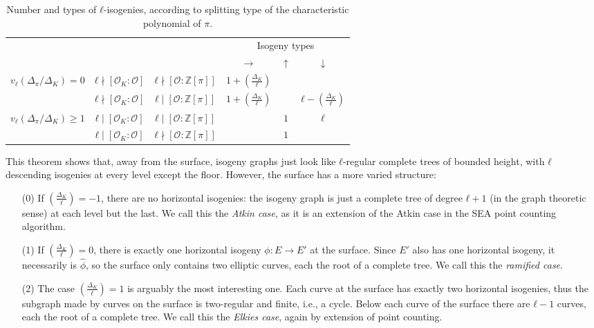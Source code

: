 \documentclass[10pt]{article}
\theoremstyle{plain}
\theoremstyle{definition}
\def\O{\ensuremath{\mathcal{O}}}
\newcommand{\leg}[2]{\left(\frac{#1}{#2}\right)}
\begin{document}
\begin{prposition}
\begin{table}
  \centering
  \def\arraystretch{1.3}
  \begin{tabular}{c | c | c | c c c}
    \multicolumn{3}{c|}{} & \multicolumn{3}{c}{Isogeny types}\\
    \multicolumn{3}{c|}{} & $→$ & $↑$ & $↓$\\
    \hline
    $v_ℓ(Δ_π/Δ_K)=0$ & $ℓ\nmid[\O_K:\O]$ & $ℓ\nmid[\O:ℤ[π]]$ & $1+\leg{Δ_K}{ℓ}$& &\\
    \hline
    & $ℓ\nmid[\O_K:\O]$ & $ℓ\mid[\O:ℤ[π]]$ &$1+\leg{Δ_K}{ℓ}$& &$ℓ-\leg{Δ_K}{ℓ}$\\
    $v_ℓ(Δ_π/Δ_K)≥1$ & $ℓ\mid[\O_K:\O]$ & $ℓ\mid[\O:ℤ[π]]$ &  &$1$&$ℓ$\\
    & $ℓ\mid[\O_K:\O]$ & $ℓ\nmid[\O:ℤ[π]]$ & &$1$& 
  \end{tabular}
  \caption{Number and types of $ℓ$-isogenies, according to splitting
    type of the characteristic polynomial of $π$.}
  \label{tab:periodic-table}
\end{table}

This theorem shows that, away from the surface, isogeny graphs just
look like $ℓ$-regular complete trees of bounded height, with $ℓ$
descending isogenies at every level except the floor. %
However, the surface has a more varied structure:
\begin{itemize}
\item[(0)] If $\leg{Δ_K}{ℓ}=-1$, there are no horizontal isogenies:
  the isogeny graph is just a complete tree of degree $ℓ+1$ (in the
  graph theoretic sense) at each level but the last. %
  We call this the \emph{Atkin case}, as it is an extension of the
  Atkin case in the SEA point counting algorithm.
\item[(1)] If $\leg{Δ_K}{ℓ}=0$, there is exactly one horizontal
  isogeny $ϕ:E→E'$ at the surface. %
  Since $E'$ also has one horizontal isogeny, it necessarily is
  $\hat{ϕ}$, so the surface only contains two elliptic curves, each
  the root of a complete tree. %
  We call this the \emph{ramified case}.
\item[(2)] The case $\leg{Δ_K}{ℓ}=1$ is arguably the most interesting
  one. %
  Each curve at the surface has exactly two horizontal isogenies, thus
  the subgraph made by curves on the surface is two-regular and
  finite, i.e., a cycle. %
  Below each curve of the surface there are $ℓ-1$ curves, each the
  root of a complete tree. %
  We call this the \emph{Elkies case}, again by extension of point
  counting. %
\end{itemize}


\end{prposition}
\end{document}
